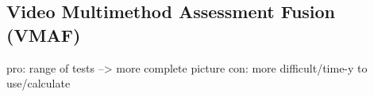 \subsection{Video Multimethod Assessment Fusion (VMAF)}
pro: range of tests --> more complete picture
con: more difficult/time-y to use/calculate

